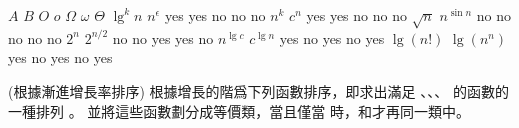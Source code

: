 \bTABLE[align=center]
\bTABLEhead
\bTR
	\bTH $A$ \eTH
	\bTH $B$ \eTH
	\bTH $O$ \eTH
	\bTH $o$ \eTH
	\bTH $\Omega$ \eTH
	\bTH $\omega$ \eTH
	\bTH $\Theta$ \eTH
\eTR
\eTABLEhead
\bTABLEbody
\bTR
	\bTD $\lg^k n$ \eTD
	\bTD $n^\epsilon$ \eTD
	\bTD\startANSWER yes \stopANSWER\eTD
	\bTD\startANSWER yes \stopANSWER\eTD
	\bTD\startANSWER no \stopANSWER\eTD
	\bTD\startANSWER no \stopANSWER\eTD
	\bTD\startANSWER no \stopANSWER\eTD
\eTR
\bTR
	\bTD $n^k$ \eTD
	\bTD $c^n$ \eTD
	\bTD\startANSWER yes \stopANSWER\eTD
	\bTD\startANSWER yes \stopANSWER\eTD
	\bTD\startANSWER no \stopANSWER\eTD
	\bTD\startANSWER no \stopANSWER\eTD
	\bTD\startANSWER no \stopANSWER\eTD
\eTR
\bTR
	\bTD $\sqrt{n}$ \eTD
	\bTD $n^{\sin n}$ \eTD
	\bTD\startANSWER no \stopANSWER\eTD
	\bTD\startANSWER no \stopANSWER\eTD
	\bTD\startANSWER no \stopANSWER\eTD
	\bTD\startANSWER no \stopANSWER\eTD
	\bTD\startANSWER no \stopANSWER\eTD
\eTR
\bTR
	\bTD $2^n$ \eTD
	\bTD $2^{n/2}$ \eTD
	\bTD\startANSWER no \stopANSWER\eTD
	\bTD\startANSWER no \stopANSWER\eTD
	\bTD\startANSWER yes \stopANSWER\eTD
	\bTD\startANSWER yes \stopANSWER\eTD
	\bTD\startANSWER no \stopANSWER\eTD
\eTR
\bTR
	\bTD $n^{\lg c}$ \eTD
	\bTD $c^{\lg n}$ \eTD
	\bTD\startANSWER yes \stopANSWER\eTD
	\bTD\startANSWER no \stopANSWER\eTD
	\bTD\startANSWER yes \stopANSWER\eTD
	\bTD\startANSWER no \stopANSWER\eTD
	\bTD\startANSWER yes \stopANSWER\eTD
\eTR
\bTR
	\bTD $\lg(n!)$ \eTD
	\bTD $\lg(n^n)$ \eTD
	\bTD\startANSWER yes \stopANSWER\eTD
	\bTD\startANSWER no \stopANSWER\eTD
	\bTD\startANSWER yes \stopANSWER\eTD
	\bTD\startANSWER no \stopANSWER\eTD
	\bTD\startANSWER yes \stopANSWER\eTD
\eTR
\eTABLEbody
\eTABLE
\stopPROBLEM

\startPROBLEM
(根據漸進增長率排序)
\startigBase[a]
\startitem
根據增長的階爲下列函數排序，即求出滿足
、、\m{\ldots}、
的函數的一種排列 。
並將這些函數劃分成等價類，當且僅當 時，和才再同一類中。

\bTABLE[align=center]
\bTR \bTD {} \eTD \bTD {} \eTD \bTD {} \eTD \bTD {} \eTD \bTD {} \eTD \bTD {} \eTD \eTR
\bTR \bTD {} \eTD \bTD {} \eTD \bTD {} \eTD \bTD {} \eTD \bTD {} \eTD \bTD {} \eTD \eTR
\bTR \bTD {} \eTD \bTD {} \eTD \bTD {} \eTD \bTD {} \eTD \bTD {} \eTD \bTD {} \eTD \eTR
\bTR \bTD {} \eTD \bTD {} \eTD \bTD {} \eTD \bTD {} \eTD \bTD {} \eTD \bTD {} \eTD \eTR
\bTR \bTD {} \eTD \bTD {} \eTD \bTD {} \eTD \bTD {} \eTD \bTD {} \eTD \bTD {} \eTD \eTR
\eTABLE
\stopitem

